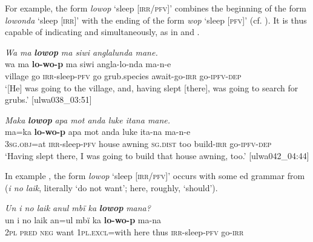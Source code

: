   For example, the form \textit{lowop} ‘sleep [\textsc{irr/pfv}]’ combines the beginning of the  form \textit{lowonda} ‘sleep [\textsc{irr}]’ with the ending of the  form \textit{wop} ‘sleep [\textsc{pfv}]’ (cf. ). It is thus capable of indicating   and   simultaneously, as in  and .

\ea%
    \label{ex:verbs:59}

          \textit{Wa ma} \textbf{\textit{lowop}} \textit{ma siwi anglalunda mane.}\\

\gll    wa     ma  \textbf{lo-wo-p}    ma  siwi     angla-lo{}-nda    ma-n-e\\
    village  go  \textsc{irr}{}-sleep-\textsc{pfv}  go  grub.species  await-go-\textsc{irr}    go-\textsc{ipfv-dep}\\


\glt `[He] was going to the village, and, having slept [there], was going to search for grubs.’ [ulwa038\_03:51]
\z

\ea%
    \label{ex:verbs:60}

          \textit{Maka} \textbf{\textit{lowop}} \textit{apa mot anda luke itana mane.}\\

\gll    ma=ka      \textbf{lo-wo-p}    apa  mot     anda     luke    ita-na    ma-n-e\\
    \textsc{3sg.obj}=at  \textsc{irr}{}-sleep-\textsc{pfv}  house  awning  \textsc{sg.dist}  too    build-\textsc{irr}  go-\textsc{ipfv-dep}\\


\glt `Having slept there, I was going to build that house awning, too.’ [ulwa042\_04:44]
\z

In example , the form \textit{lowop} ‘sleep [\textsc{irr/pfv}]’ occurs with some ed grammar from  (\textit{i no laik}, literally ‘do not want’; here, roughly, ‘should’).

\ea%
    \label{ex:verbs:61}

          \textit{Un i no laik anul mbï ka} \textbf{\textit{lowop}} \textit{mana?}\\

\gll    un  i    no    laik  an=ul        mbï  ka    \textbf{lo-wo-p}    ma-na\\
    2\textsc{pl}  \textsc{pred}  \textsc{neg}  want  1\textsc{pl.excl}=with  here  thus      \textsc{irr}{}-sleep-\textsc{pfv}  go-\textsc{irr}\\

